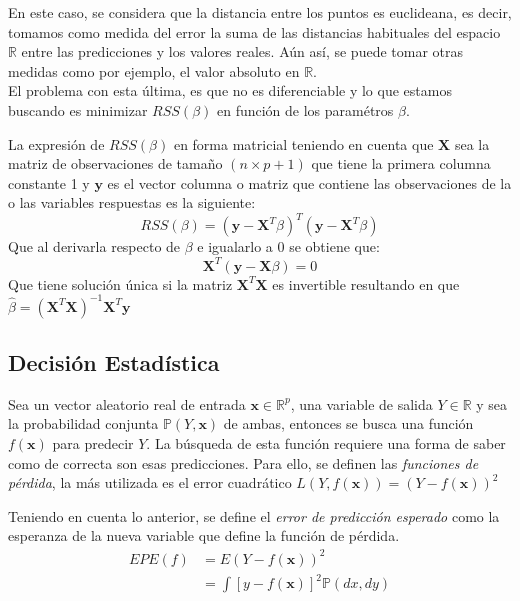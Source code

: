 \noindent En este caso, se considera que la distancia entre los puntos es euclideana, es decir, tomamos como medida del error la suma de las distancias habituales del espacio $\mathbb{R}$ entre las predicciones y los valores reales. Aún así, se puede tomar otras medidas como por ejemplo, el valor absoluto en $\mathbb{R}$.\\
El problema con esta última, es que no es diferenciable y lo que estamos buscando es minimizar $RSS(\beta)$ en función de los paramétros $\beta$.

\noindent La expresión de $RSS(\beta)$ en forma matricial teniendo en cuenta que $\textbf{X}$ sea la matriz de observaciones de tamaño $(n\times p+1)$ que tiene la primera columna constante 1 y $\textbf{y}$ es el vector columna o matriz que contiene las observaciones de la o las variables respuestas  es la siguiente: 
\begin{equation}
RSS(\beta)=(\textbf{y}-\textbf{X}^T\beta)^T(\textbf{y}-\textbf{X}^T\beta)
\end{equation}
Que al derivarla respecto de $\beta$ e igualarlo a $0$ se obtiene que:
\begin{equation}
\textbf{X}^T(\textbf{y}-\textbf{X}\beta)=0
\end{equation}
Que tiene solución única si la matriz $\textbf{X}^T\textbf{X}$ es invertible resultando en que $\hat{\beta}=(\textbf{X}^T\textbf{X})^{-1}\textbf{X}^T\textbf{y}$

\subsection{Decisión Estadística}
\noindent Sea un vector aleatorio real de entrada $\textbf{x}\in\mathbb{R}^p$, una variable de salida $Y\in\mathbb{R}$ y sea la probabilidad conjunta $\mathbb{P}(Y,\textbf{x})$ de ambas, entonces se busca una función $f(\textbf{x})$ para predecir $Y$. La búsqueda de esta función requiere una forma de saber como de correcta son esas predicciones. Para ello, se definen las \textit{funciones de pérdida}, la más utilizada es el error cuadrático $L(Y,f(\textbf{x}))=(Y-f(\textbf{x}))^2$
\begin{defi}
Teniendo en cuenta lo anterior, se define el \textit{error de predicción esperado} como la esperanza de la nueva variable que define la función de pérdida.
\begin{equation}
\begin{split}
EPE(f)& = E(Y-f(\textbf{x}))^2\\
&= \int [y-f(\textbf{x})]^2\mathbb{P}(dx,dy)
\end{split}
\end{equation}
\end{defi}

